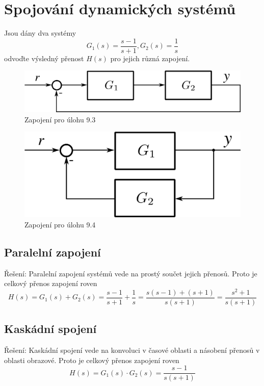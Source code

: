 \documentclass[twoside]{article}
\begin{document}
\section{Spojování dynamických systémů}
\label{sec:ukol9}
Jsou dány dva systémy
\begin{equation*}
	G_1(s) = \frac{s-1}{s+1}, G_2(s) = \frac{1}{s}
\end{equation*}
odvoďte výsledný přenost $H(s)$ pro jejich různá zapojení.
\begin{figure}[htbp]
	\centering
	\includegraphics[width=.4\textwidth]{zadani9-3.png}
	\caption{Zapojení pro úlohu 9.3}
	\label{fig:zadani9-3}
\end{figure}
\begin{figure}[htbp]
	\centering
	\includegraphics[width=.4\textwidth]{zadani9-4.png}
	\caption{Zapojení pro úlohu 9.4}
	\label{fig:zadani9-4}
\end{figure}
\subsection{Paralelní zapojení} 
Řešení: Paralelní zapojení systémů vede na prostý součet jejich přenosů. Proto je celkový přenos zapojení roven
\begin{equation*}
	H(s) = G_1(s) + G_2(s) = \frac{s-1}{s+1} + \frac{1}{s} = \frac{s(s-1) + (s+1)}{s(s+1)} = \frac{s^2 + 1}{s (s+1)}
\end{equation*}
\subsection{Kaskádní spojení}
\label{sec:ukol9:2}
Řešení: Kaskádní spojení vede na konvoluci v časové oblasti a násobení přenosů v oblasti obrazové. Proto je celkový přenos zapojení roven
\begin{equation*}
	H(s) = G_1(s) \cdot G_2(s) = \frac{s-1}{s(s+1)}
\end{equation*}
\end{document}
